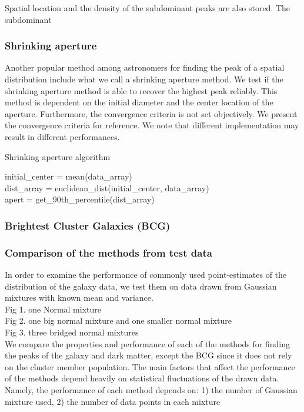 \documentclass[letterpaper,useAMS,usenatbib]{mn2e}
\begin{document}
Spatial location and the density of the subdominant peaks are also stored.
The subdominant 

\subsubsection{Shrinking aperture}
Another popular method among astronomers for finding the peak of a spatial
distribution include what we call a shrinking aperture method.
We test if the shrinking aperture method is able to recover the highest peak reliably.
This method is dependent on the initial diameter and the center location of the aperture.
Furthermore, the convergence criteria is not set objectively. We present the
convergence criteria for reference. We note that different implementation may result in
different performances.
\begin{algorithm}
	\caption{Shrinking aperture algorithm}
	 \hrulefill

	initial_center = mean(data\_array)\\
 	dist\_array = euclidean_dist(initial_center, data_array)\\
 	apert = get\_90th\_percentile(dist\_array)\\ 
	   \hrulefill
 \end{algorithm}




\subsubsection{Brightest Cluster Galaxies (BCG)}

\subsubsection{Comparison of the methods from test data}
In order to examine the performance of commonly used point-estimates of the
distribution of the galaxy data, we test them on data drawn from Gaussian mixtures with
known mean and variance. \\
Fig 1. one Normal mixture \\  
Fig 2. one big normal mixture and one smaller normal mixture \\ 
Fig 3. three bridged normal mixtures \\  
We compare the properties and performance of each of the
methods for finding the peaks of the galaxy and dark matter, 
except the BCG since it does not rely on the cluster member population. 
The main factors that affect the performance of the methods depend heavily on
statistical fluctuations of the drawn data. Namely, the performance of each
method depends on: 1) the
number of Gaussian mixture used, 2) the number of data points in each mixture
\end{document}
